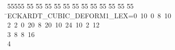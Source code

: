 %
%
\begin{tabbing}
55555 \= 55 \= 55 \= 55 \= 55 \= 55 \= 55 \= 55 \= 55 \= 55 \= 55 \= 55 \= 55 \= \>ECKARDT\_CUBIC\_DEFORM1\_LEX=0\ 10\ 0\ 8\ 10\ \\[0pt]
2\ 2\ 0\ 20\ 8\ 20\ 10\ 24\ 10\ 2\ 12\ \\[0pt]
3\ 8\ 8\ 16\ \\[0pt]
4\>\end{tabbing}
